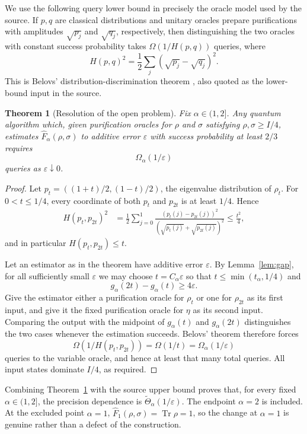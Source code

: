 \documentclass[10pt]{article}
\newtheorem{theorem}{Theorem}
\newcommand{\Tr}{\operatorname{Tr}}
\newcommand{\Fh}{\widehat F}
\newcommand{\eps}{\varepsilon}
\begin{document}
We use the following query lower bound in precisely the oracle model used by
the source.  If $p,q$ are classical distributions and unitary oracles prepare
purifications with amplitudes $\sqrt{p_j}$ and $\sqrt{q_j}$, respectively,
then distinguishing the two oracles with constant success probability takes
$\Omega(1/H(p,q))$ queries, where
\[
 H(p,q)^2=\frac12\sum_j(\sqrt{p_j}-\sqrt{q_j})^2.
\]
This is Belovs' distribution-discrimination theorem
\cite[Theorem~4]{belovs}, also quoted as the lower-bound input in the source.

\begin{theorem}[Resolution of the open problem]\label{thm:main}
Fix $\alpha\in(1,2]$.  Any quantum algorithm which, given purification
oracles for $\rho$ and $\sigma$ satisfying $\rho,\sigma\geq I/4$, estimates
$\Fh_\alpha(\rho,\sigma)$ to additive error $\eps$ with success probability
at least $2/3$ requires
\[
 \Omega_\alpha(1/\eps)
\]
queries as $\eps\downarrow0$.
\end{theorem}

\begin{proof}
Let $p_t=((1+t)/2,(1-t)/2)$, the eigenvalue distribution of $\rho_t$.
For $0<t\leq1/4$, every coordinate of both $p_t$ and $p_{2t}$ is at least
$1/4$.  Hence
\begin{align*}
 H(p_t,p_{2t})^2
 &=\frac12\sum_{j=0}^1
   \frac{(p_t(j)-p_{2t}(j))^2}
        {(\sqrt{p_t(j)}+\sqrt{p_{2t}(j)})^2}
 \leq \frac{t^2}{4},
\end{align*}
and in particular $H(p_t,p_{2t})\leq t$.

Let an estimator as in the theorem have additive error $\eps$.  By
Lemma~\ref{lem:gap}, for all sufficiently small $\eps$ we may choose
$t=C_\alpha\eps$ so that $t\leq\min(t_\alpha,1/4)$ and
\[
 g_\alpha(2t)-g_\alpha(t)\geq4\eps.
\]
Give the estimator either a purification oracle for $\rho_t$ or one for
$\rho_{2t}$ as its first input, and give it the fixed purification oracle for
$\eta$ as its second input.  Comparing the output with the midpoint of
$g_\alpha(t)$ and $g_\alpha(2t)$ distinguishes the two cases whenever the
estimation succeeds.  Belovs' theorem therefore forces
\[
 \Omega(1/H(p_t,p_{2t}))=\Omega(1/t)=\Omega_\alpha(1/\eps)
\]
queries to the variable oracle, and hence at least that many total queries.
All input states dominate $I/4$, as required.
\end{proof}

Combining Theorem~\ref{thm:main} with the source upper bound proves that, for
every fixed $\alpha\in(1,2]$, the precision dependence is
$\widetilde\Theta_\alpha(1/\eps)$.  The endpoint $\alpha=2$ is included.
At the excluded point $\alpha=1$, $\Fh_1(\rho,\sigma)=\Tr\rho=1$, so the
change at $\alpha=1$ is genuine rather than a defect of the construction.
\end{document}
